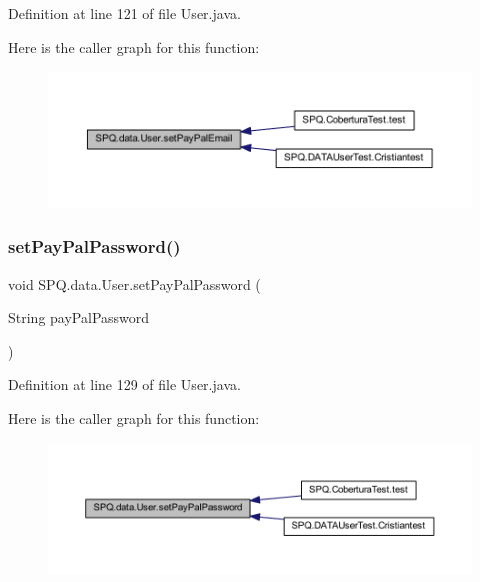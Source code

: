 Definition at line 121 of file User.\+java.

Here is the caller graph for this function\+:
\nopagebreak
\begin{figure}[H]
\begin{center}
\leavevmode
\includegraphics[width=350pt]{class_s_p_q_1_1data_1_1_user_abe8156eec92d2d94d290b96af8e8ea94_icgraph}
\end{center}
\end{figure}
\mbox{\label{class_s_p_q_1_1data_1_1_user_a61ca04ab3f3c854aa272f3097b355eb9}} 
\subsubsection{\texorpdfstring{set\+Pay\+Pal\+Password()}{setPayPalPassword()}}
{\footnotesize\ttfamily void S\+P\+Q.\+data.\+User.\+set\+Pay\+Pal\+Password (\begin{DoxyParamCaption}\item[{String}]{pay\+Pal\+Password }\end{DoxyParamCaption})}



Definition at line 129 of file User.\+java.

Here is the caller graph for this function\+:
\nopagebreak
\begin{figure}[H]
\begin{center}
\leavevmode
\includegraphics[width=350pt]{class_s_p_q_1_1data_1_1_user_a61ca04ab3f3c854aa272f3097b355eb9_icgraph}
\end{center}
\end{figure}
\mbox{\label{class_s_p_q_1_1data_1_1_user_a6519805f5204c8d1add91a917634f588}} 
